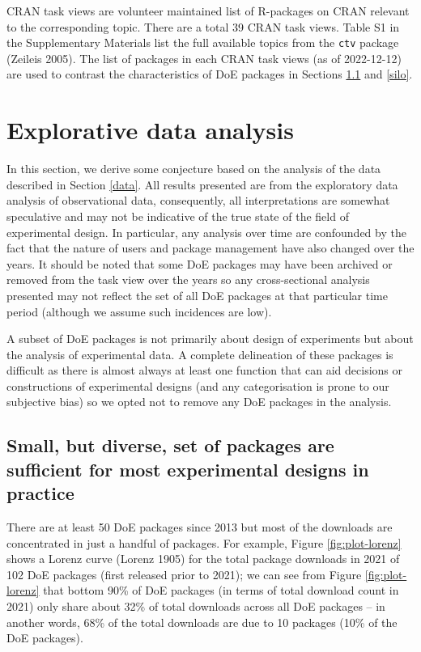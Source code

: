\documentclass{article}
\begin{document}
CRAN task views are volunteer maintained list of R-packages on CRAN
relevant to the corresponding topic. There are a total 39 CRAN task
views. Table S1 in the Supplementary Materials list the full available
topics from the \texttt{ctv} package (Zeileis 2005). The list of
packages in each CRAN task views (as of 2022-12-12) are used to contrast
the characteristics of DoE packages in Sections \ref{popular} and
\ref{silo}.

\hypertarget{eda}{%
\section{Explorative data analysis}\label{eda}}

In this section, we derive some conjecture based on the analysis of the
data described in Section \ref{data}. All results presented are from the
exploratory data analysis of observational data, consequently, all
interpretations are somewhat speculative and may not be indicative of
the true state of the field of experimental design. In particular, any
analysis over time are confounded by the fact that the nature of users
and package management have also changed over the years. It should be
noted that some DoE packages may have been archived or removed from the
task view over the years so any cross-sectional analysis presented may
not reflect the set of all DoE packages at that particular time period
(although we assume such incidences are low).

A subset of DoE packages is not primarily about design of experiments
but about the analysis of experimental data. A complete delineation of
these packages is difficult as there is almost always at least one
function that can aid decisions or constructions of experimental designs
(and any categorisation is prone to our subjective bias) so we opted not
to remove any DoE packages in the analysis.

\hypertarget{popular}{%
\subsection{Small, but diverse, set of packages are sufficient for most
experimental designs in practice}\label{popular}}

There are at least 50 DoE packages since 2013 but most of the downloads
are concentrated in just a handful of packages. For example, Figure
\ref{fig:plot-lorenz} shows a Lorenz curve (Lorenz 1905) for the total
package downloads in 2021 of 102 DoE packages (first released prior to
2021); we can see from Figure \ref{fig:plot-lorenz} that bottom 90\% of
DoE packages (in terms of total download count in 2021) only share about
32\% of total downloads across all DoE packages -- in another words,
68\% of the total downloads are due to 10 packages (10\% of the DoE
packages).
\end{document}
